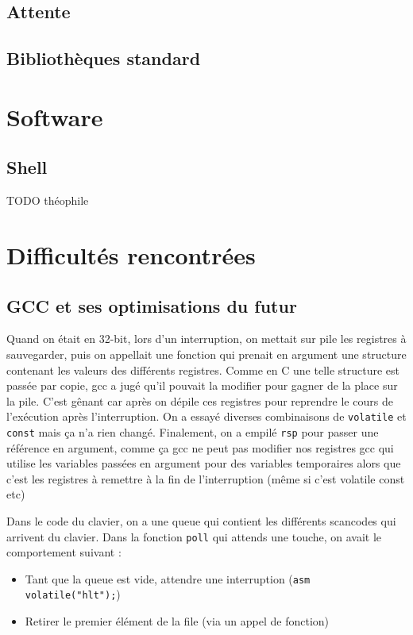 \documentclass[12pt]{report}
\begin{document}
\section{Attente}

\section{Bibliothèques standard}

\chapter{Software}

\section{Shell}

TODO théophile

\chapter{Difficultés rencontrées}

\section*{GCC et ses optimisations du futur}

Quand on était en 32-bit, lors d'un interruption, on mettait sur pile les registres à sauvegarder, puis on appellait une fonction qui prenait en argument une structure contenant les valeurs des différents registres.
Comme en C une telle structure est passée par copie, gcc a jugé qu'il pouvait la modifier pour gagner de la place sur la pile.
C'est gênant car après on dépile ces registres pour reprendre le cours de l'exécution après l'interruption.
On a essayé diverses combinaisons de \verb$volatile$ et \verb$const$ mais ça n'a rien changé.
Finalement, on a empilé \verb$rsp$ pour passer une référence en argument, comme ça gcc ne peut pas modifier nos registres
gcc qui utilise les variables passées en argument pour des variables temporaires alors que c'est les registres à remettre à la fin de l'interruption (même si c'est volatile const etc)

Dans le code du clavier, on a une queue qui contient les différents scancodes qui arrivent du clavier. Dans la fonction \verb$poll$ qui attends une touche, on avait le comportement suivant :
\begin{itemize}
    \item Tant que la queue est vide, attendre une interruption (\verb$asm volatile("hlt");$)
    \item Retirer le premier élément de la file (via un appel de fonction)
\end{itemize}
\end{document}
